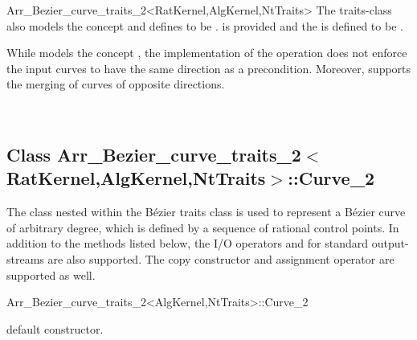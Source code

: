 \begin{ccRefClass}{Arr_Bezier_curve_traits_2<RatKernel,AlgKernel,NtTraits>}
The traits-class also models the  concept
and defines  to
be .
 is provided and the 
is defined to be .

While \ccRefName{} models the concept
, the implementation of
the  operation does not enforce the input curves
to have the same direction as a precondition. Moreover, \ccRefName{}
supports the merging of curves of opposite directions.


\ccIsModel
   \\
  

\ccTypes



\subsection*{Class
         Arr\_Bezier\_curve\_traits\_2$<$RatKernel,AlgKernel,NtTraits$>$::Curve\_2}

The  class nested within the B\'ezier traits class is used
to represent a B\'ezier curve of arbitrary degree, which is defined by a
sequence of rational control points. In addition to the methods listed
below, the I/O operators  and  for
standard output-streams are also supported. The copy constructor and
assignment operator are supported as well.

\begin{ccClass}{Arr_Bezier_curve_traits_2<AlgKernel,NtTraits>::Curve_2}
% 
\ccCreation
{}

  {default constructor.}



\end{ccClass}
\end{ccRefClass}
